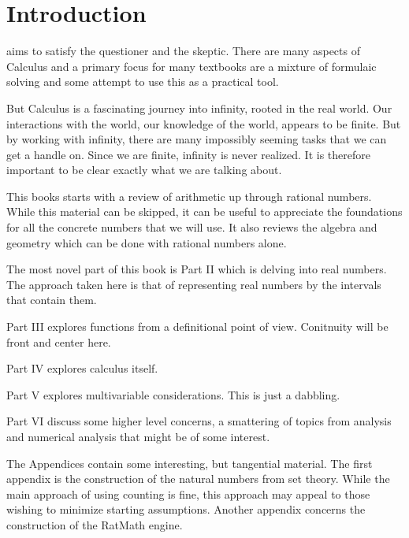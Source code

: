 \chapter{Introduction}

 aims to satisfy the questioner and the skeptic. There are many aspects of Calculus and a primary focus for many textbooks are a mixture of formulaic solving and some attempt to use this as a practical tool. 

But Calculus is a fascinating journey into infinity, rooted in the real world. Our interactions with the world, our knowledge of the world, appears to be finite. But by working with infinity, there are many impossibly seeming tasks that we can get a handle on. Since we are finite, infinity is never realized. It is therefore important to be clear exactly what we are talking about. 

This books starts with a review of arithmetic up through rational numbers. While this material can be skipped, it can be useful to appreciate the foundations for all the concrete numbers that we will use. It also reviews the algebra and geometry which can be done with rational numbers alone. 

The most novel part of this book is Part II which is delving into real numbers. The approach taken here is that of representing real numbers by the intervals that contain them. 

Part III explores functions from a definitional point of view. Conitnuity will be front and center here. 

Part IV explores calculus itself.  

Part V explores multivariable considerations. This is just a dabbling. 

Part VI discuss some higher level concerns, a smattering of topics from analysis and numerical analysis that might be of some interest. 

The Appendices contain some interesting, but tangential material. The first appendix is the construction of the natural numbers from set theory. While the main approach of using counting is fine, this approach may appeal to those wishing to minimize starting assumptions. Another appendix concerns the construction of the RatMath engine. 